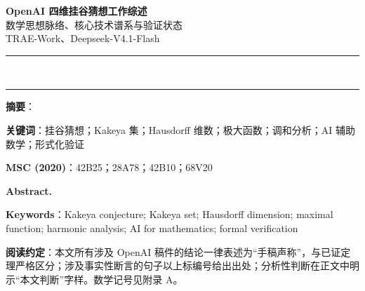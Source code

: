\documentclass[11pt,a4paper]{ctexart}
\theoremstyle{navystyle}
\theoremstyle{skystyle}
\begin{document}
\begin{center}
  {\LARGE\bfseries\color{navy} OpenAI 四维挂谷猜想工作综述}\\[7pt]
  {\large\color{navy} 数学思想脉络、核心技术谱系与验证状态}\\[12pt]
  {\normalsize TRAE-Work、Deepseek-V4.1-Flash}\\[12pt]
  {\color{navy}\rule{0.86\textwidth}{1.1pt}}\\[2pt]
  {\color{sky}\rule{0.86\textwidth}{0.5pt}}
\end{center}

\vspace{4pt}
\noindent\textbf{\color{navy}摘\quad 要}：
\vspace{4pt}

\noindent\textbf{\color{navy}关键词}：挂谷猜想；Kakeya 集；Hausdorff 维数；极大函数；调和分析；AI 辅助数学；形式化验证

\vspace{4pt}
\noindent\textbf{\color{navy}MSC (2020)}：42B25；28A78；42B10；68V20

\vspace{6pt}
\noindent\textbf{\color{navy}Abstract.}\ 

\vspace{4pt}
\noindent\textbf{\color{navy}Keywords}：Kakeya conjecture; Kakeya set; Hausdorff dimension; maximal function; harmonic analysis; AI for mathematics; formal verification

\vspace{10pt}
\noindent\textbf{\color{navy}阅读约定}：本文所有涉及 OpenAI 稿件的结论一律表述为“手稿声称”，与已证定理严格区分；涉及事实性断言的句子以上标编号给出出处；分析性判断在正文中明示“本文判断”字样。数学记号见附录 A。

\vspace{8pt}
{\setlength{\parskip}{2pt}\tableofcontents}

\clearpage













\appendix




\FloatBarrier

\end{document}
